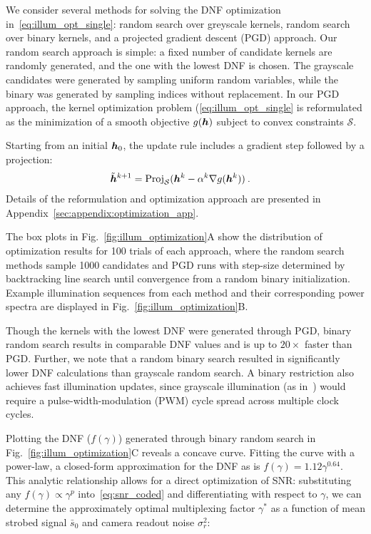 We consider several methods for solving the DNF optimization in~\eqref{eq:illum_opt_single}: random search over greyscale kernels, random search over binary kernels, and a projected gradient descent (PGD) approach. Our random search approach is simple: a fixed number of candidate kernels are randomly generated, and the one with the lowest DNF is chosen. The grayscale candidates were generated by sampling uniform random variables, while the binary was generated by sampling indices without replacement. In our PGD approach, the kernel optimization problem (\eqref{eq:illum_opt_single} is reformulated as the minimization of a smooth objective $g(\bm{h})$ subject to convex constraints $\mathcal{S}$.

Starting from an initial $\bm{h}_0$, the update rule includes a gradient step followed by a projection:
\begin{align}
    \tilde {\bm{h}}^{k+1} &= \mathrm{Proj}_{\mathcal{S}}(\bm{h}^k - \alpha^k \nabla g(\bm{h}^k))\:.
\end{align}
Details of the reformulation and optimization approach are presented in Appendix~\ref{sec:appendix:optimization_app}.

The box plots in Fig.~\ref{fig:illum_optimization}A show the distribution of optimization results for 100 trials of each approach, where the random search methods sample 1000 candidates and PGD runs with step-size determined by backtracking line search until convergence from a random binary initialization. Example illumination sequences from each method and their corresponding power spectra are displayed in Fig.~\ref{fig:illum_optimization}B.

Though the kernels with the lowest DNF were generated through PGD, binary random search results in comparable DNF values and is up to $20\times$ faster than PGD. Further, we note that a random binary search resulted in significantly lower DNF calculations than grayscale random search. A binary restriction also achieves fast illumination updates, since grayscale illumination (as in~\cite{Ma:15}) would require a pulse-width-modulation (PWM) cycle spread across multiple clock cycles.

Plotting the DNF ($f(\gamma)$) generated through binary random search in Fig.~\ref{fig:illum_optimization}C reveals a concave curve. Fitting the curve with a power-law, a closed-form approximation for the DNF as is $f(\gamma)=1.12\gamma^{0.64}$. This analytic relationship allows for a direct optimization of SNR: substituting any $f(\gamma) \propto \gamma^p$ into~\eqref{eq:snr_coded} and differentiating with respect to $\gamma$, we can determine the approximately optimal multiplexing factor $\gamma^*$ as a function of mean strobed signal $\bar{s}_0$ and camera readout noise $\sigma_r^2$:

